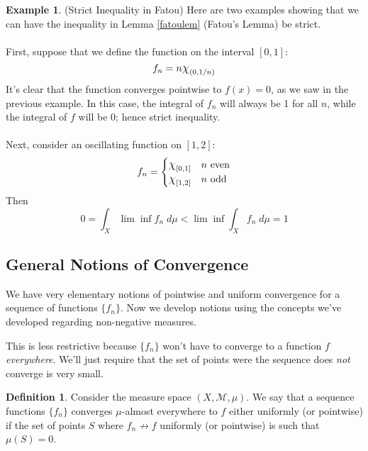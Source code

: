 \documentclass[12pt]{article}
\theoremstyle{plain}
\theoremstyle{definition}
\newtheorem{defn}[thm]{Definition}
\newtheorem{ex}[thm]{Example}
\theoremstyle{remark}
\newcommand*{\Chi}{\mbox{\large$\chi$}} %
\begin{document}
\begin{ex} (Strict Inequality in Fatou) Here are two examples showing that we can have the inequality in Lemma \ref{fatoulem} (Fatou's Lemma) be strict.
\\
\\
First, suppose that we define the function on the interval $[0,1]$:
\[
    f_n = n \Chi_{(0,1/n)}
\]
It's clear that the function converges pointwise to $f(x)=0$, as we saw in the previous example. In this case, the integral of $f_n$ will always be 1 for all $n$, while the integral of $f$ will be 0; hence strict inequality.
\\
\\
Next, consider an oscillating function on $[1,2]$:
\[
    f_n = 
    \begin{cases}
        \Chi_{[0,1]} & \text{$n$ even} \\
        \Chi_{[1,2]} & \text{$n$ odd} \\
    \end{cases}
\]
Then
\[
    0 = \int_X \lim \inf f_n \; d\mu
    <  \lim \inf\int_X f_n \; d\mu = 1
\]
\end{ex}

\subsection{General Notions of Convergence}

We have very elementary notions of pointwise and uniform convergence for a sequence of functions $\{f_n\}$. Now we develop notions using the concepts we've developed regarding non-negative measures. 

This is less restrictive because $\{f_n\}$ won't have to converge to a function $f$ \emph{everywhere}. We'll just require that the set of points were the sequence does \emph{not} converge is very small.

\begin{defn}
Consider the measure space $(X,\mathscr{M},\mu)$. We say that a sequence functions $\{f_n\}$ converges $\mu$-almost everywhere to $f$ either uniformly (or pointwise) if the set of points $S$ where $f_n \not\rightarrow f$ uniformly (or pointwise) is such that $\mu(S) = 0$.
\end{defn}
\end{document}
